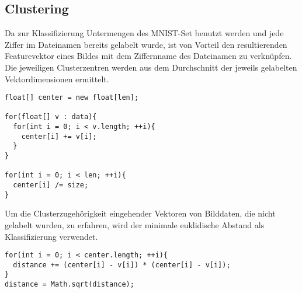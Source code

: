 \subsection{Clustering}
Da zur Klassifizierung Untermengen des MNIST-Set benutzt werden und jede Ziffer im Dateinamen bereits gelabelt wurde, ist von Vorteil den resultierenden Featurevektor eines Bildes mit dem Ziffernname des Dateinamen zu verknüpfen.
Die jeweiligen Clusterzentren werden aus dem Durchschnitt der jeweils gelabelten Vektordimensionen ermittelt.
\begin{lstlisting}
float[] center = new float[len];
        
for(float[] v : data){
  for(int i = 0; i < v.length; ++i){
    center[i] += v[i];
  }
}
        
for(int i = 0; i < len; ++i){
  center[i] /= size;
}
\end{lstlisting}
Um die Clusterzugehörigkeit eingehender Vektoren von Bilddaten, die nicht gelabelt wurden, zu erfahren, wird der minimale euklidische Abstand als Klassifizierung verwendet.
\begin{lstlisting}
for(int i = 0; i < center.length; ++i){
  distance += (center[i] - v[i]) * (center[i] - v[i]);
}
distance = Math.sqrt(distance);
\end{lstlisting}